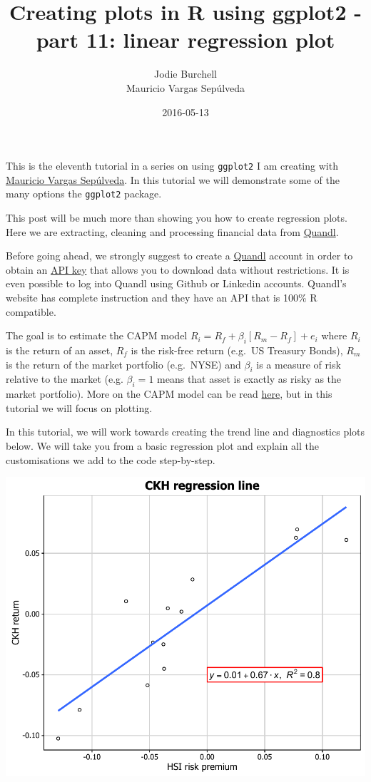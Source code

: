 \documentclass[]{article}
\title{Creating plots in R using ggplot2 - part 11: linear regression plot}
\author{Jodie Burchell \\ Mauricio Vargas Sepúlveda}
\date{2016-05-13}
\begin{document}
\maketitle

{
\setcounter{tocdepth}{2}
\tableofcontents
}
This is the eleventh tutorial in a series on using \texttt{ggplot2} I am
creating with \href{http://pachamaltese.github.io/}{Mauricio Vargas
Sepúlveda}. In this tutorial we will demonstrate some of the many
options the \texttt{ggplot2} package.

This post will be much more than showing you how to create regression
plots. Here we are extracting, cleaning and processing financial data
from \href{https://www.quandl.com/}{Quandl}.

Before going ahead, we strongly suggest to create a
\href{https://www.quandl.com/}{Quandl} account in order to obtain an
\href{https://www.quandl.com/account/api}{API key} that allows you to
download data without restrictions. It is even possible to log into
Quandl using Github or Linkedin accounts. Quandl's website has complete
instruction and they have an API that is 100\% R compatible.

The goal is to estimate the CAPM model
\(R_i = R_f + \beta_i [R_m - R_f] + e_i\) where \(R_i\) is the return of
an asset, \(R_f\) is the risk-free return (e.g.~US Treasury Bonds),
\(R_m\) is the return of the market portfolio (e.g.~NYSE) and
\(\beta_i\) is a measure of risk relative to the market (e.g.
\(\beta_i = 1\) means that asset is exactly as risky as the market
portfolio). More on the CAPM model can be read
\href{http://people.stern.nyu.edu/ashapiro/courses/B01.231103/FFL09.pdf}{here},
but in this tutorial we will focus on plotting.

In this tutorial, we will work towards creating the trend line and
diagnostics plots below. We will take you from a basic regression plot
and explain all the customisations we add to the code step-by-step.

\begin{center}\includegraphics{11_Linear_Regression_Plot_pdf/lr_final-1} \end{center}
\end{document}
